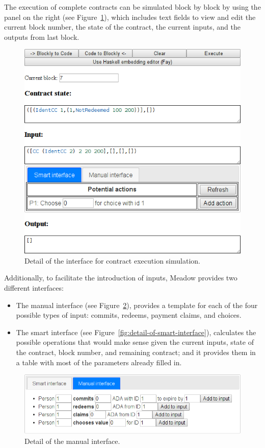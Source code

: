 \documentclass[runningheads]{llncs}
\begin{document}
The execution of complete contracts can be simulated block by block
by using the panel on the right (see Figure~\ref{fig:detail-of-interface}),
which includes text fields to view and edit the current block number,
the state of the contract, the current inputs, and the outputs from
last block.

\begin{figure}
\centering{}\includegraphics[scale=0.5]{pix/detail2}\caption{\label{fig:detail-of-interface}Detail of the interface for 
contract
execution simulation.}
\end{figure}

Additionally, to facilitate the introduction of inputs, Meadow provides
two different interfaces:
\begin{itemize}
\item The manual interface (see Figure~\ref{fig:detail-of-manual-interface}),
provides a template for each of the four possible types of input:
commits, redeems, payment claims, and choices.
\item The smart interface (see Figure~\ref{fig:detail-of-smart-interface}),
calculates the possible operations that would make sense given the
current inputs, state of the contract, block number, and remaining
contract; and it provides them in a table with most of the parameters
already filled in.
\end{itemize}
\begin{figure}
\begin{centering}
\includegraphics[scale=0.5]{pix/detail3}
\par\end{centering}
\caption{\label{fig:detail-of-manual-interface}Detail of the manual interface.}
\end{figure}
\end{document}
